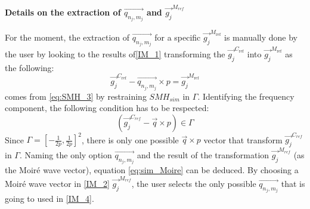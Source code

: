 \documentclass[12pt]{article}
\begin{document}
\noindent\textbf{Details on the extraction of $\overrightarrow{q_{n_j,m_j}}$ and 
$\overrightarrow{g_j}^{M_{ref}}$}\bigskip

For the moment, the extraction of $\overrightarrow{q_{n_j,m_j}}$ for a specific 
$ \overrightarrow{g_j}^{M_{\text{ref}}}$ is manually done by the user by looking 
to the results of\cref{IM_1} transforming the 
$\overrightarrow{g_j}^{C_{\text{ref}}}$ into 
$\overrightarrow{g_j}^{M_{\text{ref}}}$ as the following:
\begin{equation}
\label{eq:sim_Moire}
{\overrightarrow{g_j}^{C_{\text{ref}}}}-\overrightarrow{q_{n_j,m_j}}\times p =  
\overrightarrow{g_j}^{M_{\text{ref}}}
\end{equation}
 comes from \cref{eq:SMH_3} by restraining $SMH_{sim}$ in 
$\Gamma$. Identifying the frequency component, the following condition has to be 
respected:
\begin{equation*}
(\overrightarrow{g_j}^{C_{ref}}-\overrightarrow{q}\times p) \in \Gamma
\end{equation*}
Since $\Gamma = [-\frac{1}{2p},\frac{1}{2p}]^{2}$, there is only one possible 
$\overrightarrow{q}\times p$ vector that transform 
$\overrightarrow{g_j}^{C_{ref}}$ in $\Gamma$. Naming the only option 
$\overrightarrow{q_{n_j,m_j}}$ and the result of the transformation 
$\overrightarrow{g_j}^{M_{ref}}$ (as the Moir{\'e} wave vector), equation 
\cref{eq:sim_Moire} can be deduced. By choosing a Moir{\'e} wave vector in 
\cref{IM_2} $\overrightarrow{g_j}^{M_{ref}}$, the user selects the only possible 
$\overrightarrow{q_{n_j,m_j}}$ that is going to used in \cref{IM_4}.
\end{document}
